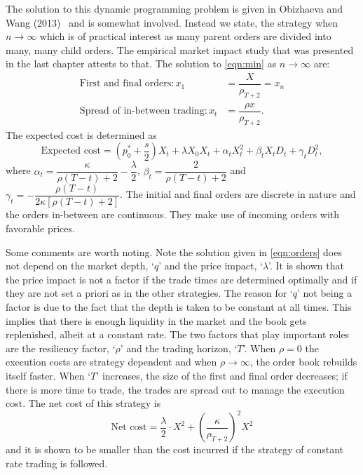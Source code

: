 The solution to this dynamic programming problem is given in Obizhaeva and Wang (2013)~\cite[p.14, Proposition 1]{obizhaeva} and is somewhat involved. Instead we state, the strategy when $n \to \infty$ which is of practical interest as many parent orders are divided into many, many child orders. The empirical market impact study that was presented in the last chapter attests to that. The solution to \eqref{eqn:min} as $n \to \infty$ are:
	\begin{equation} \label{eqn:orders}
	\begin{split}
	\text{First and final orders}: x_1&= \dfrac{X}{\rho_{T+2}} = x_n  \\
	\text{Spread of in-between trading}: x_t&= \dfrac{\rho x}{\rho_{T+2}}.
	\end{split}
	\end{equation}
The expected cost is determined as
	\begin{equation} \label{eqn:expected}
	\text{Expected cost}= \left( p_0^* + \dfrac{s}{2} \right) X_t + \lambda X_0 X_t + \alpha_t X_t^2 + \beta_t X_t D_t + \gamma_t D_t^2,
	\end{equation}
where $\alpha_t= \dfrac{\kappa}{\rho(T-t)+2} - \dfrac{\lambda}{2}$, $\beta_t= \dfrac{2}{\rho(T-t) + 2}$ and $\gamma_t= - \dfrac{\rho(T-t)}{2 \kappa[\rho(T-t) + 2]}$. The initial and final orders are discrete in nature and the orders in-between are continuous. They make use of incoming orders with favorable prices. 


Some comments are worth noting. Note the solution given in \eqref{eqn:orders} does not depend on the market depth, `$q$' and the price impact, `$\lambda$'. It is shown that the price impact is not a factor if the trade times are determined optimally and if they are not set a priori as in the other strategies. The reason for `$q$' not being a factor is due to the fact that the depth is taken to be constant at all times. This implies that there is enough liquidity in the market and the book gets replenished, albeit at a constant rate. The two factors that play important roles are the resiliency factor, `$\rho$' and the trading horizon, `$T$'. When $\rho=0$ the execution costs are strategy dependent and when $\rho \to \infty$, the order book rebuilds itself faster. When `$T$' increases, the size of the first and final order decreases; if there is more time to trade, the trades are spread out to manage the execution cost. The net cost of this strategy is
	\begin{equation}\label{eqn:netcost}
	\text{Net cost}=\dfrac{\lambda}{2} \cdot X^2 + \left(\dfrac{\kappa}{\rho_{T+2}}\right)^2 X^2
	\end{equation}
and it is shown to be smaller than the cost incurred if the strategy of constant rate trading is followed. 


